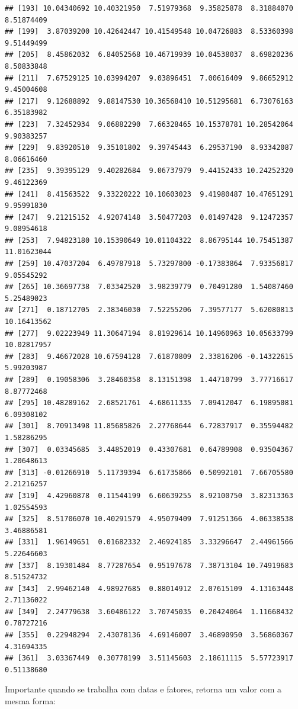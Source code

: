 \documentclass[
]{book}
\newenvironment{Shaded}{\begin{snugshade}}{\end{snugshade}}
\newcommand{\DecValTok}[1]{\textcolor[rgb]{0.00,0.00,0.81}{#1}}
\newcommand{\KeywordTok}[1]{\textcolor[rgb]{0.13,0.29,0.53}{\textbf{#1}}}
\newcommand{\NormalTok}[1]{#1}
\newcommand{\OperatorTok}[1]{\textcolor[rgb]{0.81,0.36,0.00}{\textbf{#1}}}
\newcommand{\StringTok}[1]{\textcolor[rgb]{0.31,0.60,0.02}{#1}}
\begin{document}
\begin{verbatim}
## [193] 10.04340692 10.40321950  7.51979368  9.35825878  8.31884070  8.51874409
## [199]  3.87039200 10.42642447 10.41549548 10.04726883  8.53360398  9.51449499
## [205]  8.45862032  6.84052568 10.46719939 10.04538037  8.69820236  8.50833848
## [211]  7.67529125 10.03994207  9.03896451  7.00616409  9.86652912  9.45004608
## [217]  9.12688892  9.88147530 10.36568410 10.51295681  6.73076163  6.35183982
## [223]  7.32452934  9.06882290  7.66328465 10.15378781 10.28542064  9.90383257
## [229]  9.83920510  9.35101802  9.39745443  6.29537190  8.93342087  8.06616460
## [235]  9.39395129  9.40282684  9.06737979  9.44152433 10.24252320  9.46122369
## [241]  8.41563522  9.33220222 10.10603023  9.41980487 10.47651291  9.95991830
## [247]  9.21215152  4.92074148  3.50477203  0.01497428  9.12472357  9.08954618
## [253]  7.94823180 10.15390649 10.01104322  8.86795144 10.75451387 11.01623044
## [259] 10.47037204  6.49787918  5.73297800 -0.17383864  7.93356817  9.05545292
## [265] 10.36697738  7.03342520  3.98239779  0.70491280  1.54087460  5.25489023
## [271]  0.18712705  2.38346030  7.52255206  7.39577177  5.62080813 10.16413562
## [277]  9.02223949 11.30647194  8.81929614 10.14960963 10.05633799 10.02817957
## [283]  9.46672028 10.67594128  7.61870809  2.33816206 -0.14322615  5.99203987
## [289]  0.19058306  3.28460358  8.13151398  1.44710799  3.77716617  8.87772468
## [295] 10.48289162  2.68521761  4.68611335  7.09412047  6.19895081  6.09308102
## [301]  8.70913498 11.85685826  2.27768644  6.72837917  0.35594482  1.58286295
## [307]  0.03345685  3.44852019  0.43307681  0.64789908  0.93504367  1.20648613
## [313] -0.01266910  5.11739394  6.61735866  0.50992101  7.66705580  2.21216257
## [319]  4.42960878  0.11544199  6.60639255  8.92100750  3.82313363  1.02554593
## [325]  8.51706070 10.40291579  4.95079409  7.91251366  4.06338538  3.46886581
## [331]  1.96149651  0.01682332  2.46924185  3.33296647  2.44961566  5.22646603
## [337]  8.19301484  8.77287654  0.95197678  7.38713104 10.74919683  8.51524732
## [343]  2.99462140  4.98927685  0.88014912  2.07615109  4.13163448  2.71136022
## [349]  2.24779638  3.60486122  3.70745035  0.20424064  1.11668432  0.78727216
## [355]  0.22948294  2.43078136  4.69146007  3.46890950  3.56860367  4.31694335
## [361]  3.03367449  0.30778199  3.51145603  2.18611115  5.57723917  0.51138680
\end{verbatim}

Importante quando se trabalha com datas e fatores, retorna um valor com a mesma forma:

\begin{Shaded}
\end{Shaded}
\end{document}
